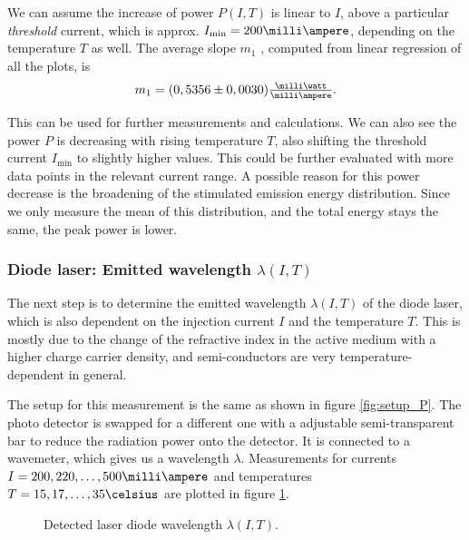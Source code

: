 We can assume the increase of power $P(I,T)$ is linear to $I$, above a particular \emph{threshold} current, which is approx. $I_\text{min}=200\milli\ampere$, depending on the temperature $T$ as well. The average slope $m_1$ , computed from linear regression of all the plots, is
\begin{align}
m_1=(0,5356\pm 0,0030)\tfrac{\milli\watt}{\milli\ampere}.
\label{eq:avg_slope1}
\end{align}

This can be used for further measurements and calculations.
We can also see the power $P$ is decreasing with rising temperature $T$, also shifting the threshold current $I_\text{min}$ to slightly higher values. This could be further evaluated with more data points in the relevant current range.
A possible reason for this power decrease is the broadening of the stimulated emission energy distribution. Since we only measure the mean of this distribution, and the total energy stays the same, the peak power is lower.

\newpage
\subsubsection{Diode laser: Emitted wavelength $\lambda(I,T)$}
\label{sec:diode_laser_lambda}
The next step is to determine the emitted wavelength $\lambda(I,T)$ of the diode laser, which is also dependent on the injection current $I$ and the temperature $T$. This is mostly due to the change of the refractive index in the active medium with a higher charge carrier density, and semi-conductors are very temperature-dependent in general.

The setup for this measurement is the same as shown in figure \ref{fig:setup_P}. The photo detector is swapped for a different one with a adjustable semi-transparent bar to reduce the radiation power onto the detector. It is connected to a wavemeter, which gives us a wavelength $\lambda$.
Measurements for currents $I=200,220,\dots,500\milli\ampere$ and temperatures $T=15,17,\dots,35\celsius$ are plotted in figure \ref{fig:lambda1}.

\begin{figure}[h]
	\centering
	
	\caption{Detected laser diode wavelength $\lambda(I,T)$.}
	\label{fig:lambda1}
\end{figure}

